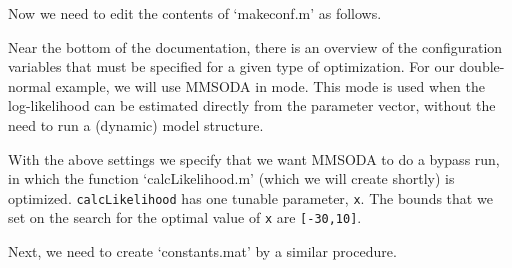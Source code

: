 
Now we need to edit the contents of `makeconf.m' as follows.


Near the bottom of the documentation, there is an overview of the configuration variables that must be specified for a given type of optimization. For our double-normal example, we will use MMSODA in  mode. This mode is used when the log-likelihood can be estimated directly from the parameter vector, without the need to run a (dynamic) model structure.



With the above settings we specify that we want MMSODA to do a bypass run, in which the function `calcLikelihood.m' (which we will create shortly) is optimized. \texttt{calcLikelihood} has one tunable parameter, \texttt{x}. The bounds that we set on the search for the optimal value of \texttt{x} are \texttt{[-30,10]}.




Next, we need to create `constants.mat' by a similar procedure.

